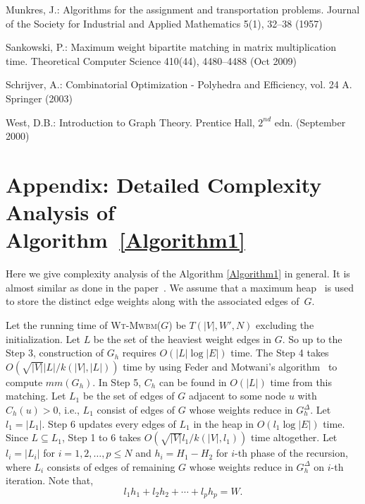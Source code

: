 \documentclass[runningheads,a4paper]{llncs}
\begin{document}
\begin{thebibliography}{10}
Munkres, J.: Algorithms for the assignment and transportation problems. Journal
  of the Society for Industrial and Applied Mathematics  5(1),  32--38 (1957)

Sankowski, P.: Maximum weight bipartite matching in matrix multiplication time.
  Theoretical Computer Science  410(44),  4480--4488 (Oct 2009)

Schrijver, A.: Combinatorial Optimization - Polyhedra and Efficiency, vol. 24
  A. Springer (2003)

West, D.B.: Introduction to Graph Theory. Prentice Hall, $2^{nd}$ edn.
  (September 2000)

\end{thebibliography}




\section{Appendix: Detailed Complexity Analysis of Algorithm~\ref{Algorithm1}}
\label{AppendixB: Detailed Complexity of MWBM}
Here we give complexity analysis of the Algorithm
\ref{Algorithm1} in general. It is almost similar as done in the paper~\cite{kao02}. We assume that a maximum heap~\cite{cormen09} is used to store the distinct edge weights along with the associated edges of~$G$.


Let the running time of \textsc{Wt-Mwbm}($G$) be $T(|V|,W',N)$ excluding the
initialization. Let $L$ be the set of the heaviest weight edges in $G$.
So up to the Step 3, construction of $G_h$ requires $O(|L|\log |E|)$ time.
The Step 4 takes $O(\sqrt{|V|} |L|/k(|V|,|L|))$ time by using Feder and
Motwani's algorithm~\cite{feder95} to compute $\textit{mm}(G_h)$. In Step 5,
$C_h$ can be found in $O(|L|)$ time from this matching. Let $L_1$ be the
set of edges of $G$ adjacent to some node $u$ with $C_h(u)>0$, i.e.,
$L_1$ consist of edges of $G$ whose weights reduce in $G_h^\Delta$. Let
$l_1=|L_1|$. Step 6 updates every edges of $L_1$ in the heap in $O(l_1 \log |E|)$ time. Since $L \subseteq L_1$, Step 1 to 6 takes
$O(\sqrt{|V|}l_1/k(|V|,l_1))$ time altogether. Let $l_i=|L_i|$ for
$i=1,2,\dots,p \leq N$ and $h_i=H_1-H_2$ for $i$-th phase of 
the recursion, where $L_i$ consists of edges of remaining $G$ whose weights 
reduce in $G_h^\Delta$ on $i$-th iteration.
 Note that, 
 $$l_1h_1+l_2h_2+ \cdots + l_ph_p=W.$$ 
 
\end{document}

